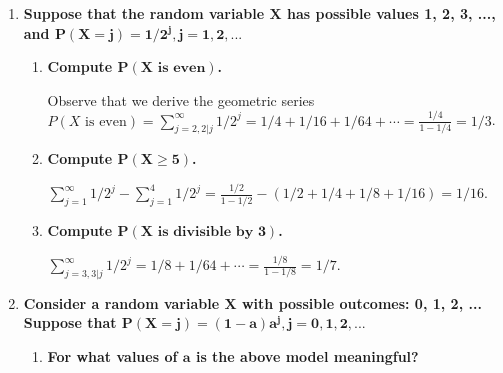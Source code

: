 \documentclass[10pt, oneside]{article}   	%
\theoremstyle{definition}
\begin{document}
\begin{enumerate}[label=4.\arabic*]
\item  \begin{tcolorbox}[
  colback=Cerulean!5!white,
  colframe=Cerulean!75!black]
\textbf{Suppose that the random variable $\bm{X}$ has possible values 1, 2, 3, ..., and $\bm{P(X = j) = 1/2^j, j = 1, 2, ...}$}
\end{tcolorbox}

	\begin{enumerate}
	\item  \begin{tcolorbox}[
	  colback=Cerulean!5!white,
	  colframe=Cerulean!75!black]
	\textbf{Compute $\bm{P(X \text{ is even})}$.}
	\end{tcolorbox}
	
	Observe that we derive the geometric series $P(X \text{ is even}) = \sum^\infty_{j = 2, 2 | j} 1/2^j = 1/4 + 1/16 + 1/64 + \cdots = \frac{1/4}{1 - 1/4} = \boxed{1/3}$.
	
	\item  \begin{tcolorbox}[
	  colback=Cerulean!5!white,
	  colframe=Cerulean!75!black]
	\textbf{Compute $\bm{P(X \geq 5)}$.}
	\end{tcolorbox}
	
	$\sum^\infty_{j = 1} 1/2^j - \sum^{4}_{j = 1} 1/2^j = \frac{1/2}{1 - 1/2} - (1/2 + 1/4 + 1/8 + 1/16) = \boxed{1/16}$.
	
	\item  \begin{tcolorbox}[
	  colback=Cerulean!5!white,
	  colframe=Cerulean!75!black]
	\textbf{Compute $\bm{P(X \text{ is divisible by }3)}$.}
	\end{tcolorbox}
	
	$\sum^\infty_{j = 3, 3 | j} 1/2^j = 1/8 + 1/64 + \cdots = \frac{1/8}{1 - 1/8} = \boxed{1/7}.$
	\end{enumerate}
	
\item  \begin{tcolorbox}[
  colback=Cerulean!5!white,
  colframe=Cerulean!75!black]
\textbf{Consider a random variable $\bm{X}$ with possible outcomes: 0, 1, 2, ... Suppose that $\bm{P(X = j) = (1 - a)a^j, j = 0, 1, 2, ...}$}
\end{tcolorbox}

	\begin{enumerate}
	\item  \begin{tcolorbox}[
	  colback=Cerulean!5!white,
	  colframe=Cerulean!75!black]
	\textbf{For what values of $\bm{a}$ is the above model meaningful?}
	\end{tcolorbox}
	

\end{enumerate}
\end{enumerate}
\end{document}

